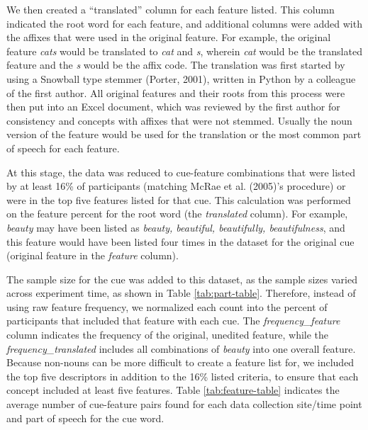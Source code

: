 \documentclass[english,,man]{apa6}
\theoremstyle{definition}
\theoremstyle{definition}
\theoremstyle{definition}
\theoremstyle{remark}
\begin{document}
We then created a \enquote{translated} column for each feature listed.
This column indicated the root word for each feature, and additional
columns were added with the affixes that were used in the original
feature. For example, the original feature \emph{cats} would be
translated to \emph{cat} and \emph{s}, wherein \emph{cat} would be the
translated feature and the \emph{s} would be the affix code. The
translation was first started by using a Snowball type stemmer (Porter,
2001), written in Python by a colleague of the first author. All
original features and their roots from this process were then put into
an Excel document, which was reviewed by the first author for
consistency and concepts with affixes that were not stemmed. Usually the
noun version of the feature would be used for the translation or the
most common part of speech for each feature.

At this stage, the data was reduced to cue-feature combinations that
were listed by at least 16\% of participants (matching McRae et al.
(2005)'s procedure) or were in the top five features listed for that
cue. This calculation was performed on the feature percent for the root
word (the \emph{translated} column). For example, \emph{beauty} may have
been listed as \emph{beauty, beautiful, beautifully, beautifulness}, and
this feature would have been listed four times in the dataset for the
original cue (original feature in the \emph{feature} column).

The sample size for the cue was added to this dataset, as the sample
sizes varied across experiment time, as shown in Table
\ref{tab:part-table}. Therefore, instead of using raw feature frequency,
we normalized each count into the percent of participants that included
that feature with each cue. The \emph{frequency\_feature} column
indicates the frequency of the original, unedited feature, while the
\emph{frequency\_translated} includes all combinations of \emph{beauty}
into one overall feature. Because non-nouns can be more difficult to
create a feature list for, we included the top five descriptors in
addition to the 16\% listed criteria, to ensure that each concept
included at least five features. Table \ref{tab:feature-table} indicates
the average number of cue-feature pairs found for each data collection
site/time point and part of speech for the cue word.
\end{document}

